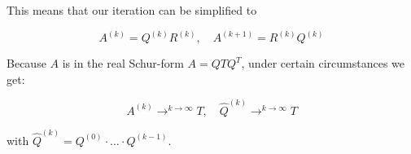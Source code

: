This means that our iteration can be simplified to 

\[
    A^{(k)} = Q^{(k)}R^{(k)}, \quad A^{(k + 1)} =  R^{(k)} Q^{(k)} 
\]

Because \(A\) is in the real Schur-form \(A = Q T Q^T\), under certain circumstances we get: 

\[
    A^{(k)} \rightarrow^{k \to \infty} T, \quad \hat{Q}^{(k)} \rightarrow^{k \to \infty} T
\]

with \(\hat{Q}^{(k)} = Q^{(0)} \cdot \dots \cdot Q^{(k - 1)}\). 

